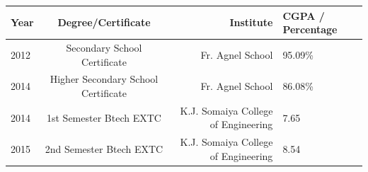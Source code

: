 \documentclass[letterpaper,11pt]{article}
\begin{document}
\begin{table}[h!]
  \begin{center}
      \begin{tabular}{l|c|r|l} %
      \hspace{0.2cm}\textbf{Year}\hspace{0.2cm} &\hspace{0.2cm} \textbf{Degree/Certificate}\hspace{0.2cm} &\hspace{0.2cm} \textbf{Institute}\hspace{2.3cm} &\hspace{0.2cm} \textbf{CGPA / Percentage}\hspace{0.2cm}\\
      \hline
       2012 & \hspace{0.2cm} Secondary School Certificate \hspace{0.2cm} & \hspace{0.2cm}Fr. Agnel School\hspace{1.7cm} & \hspace{1.2cm} 95.09\% \hspace{0.2cm}\\
       2014 & \hspace{0.2cm} Higher Secondary School Certificate \hspace{0.2cm} & \hspace{0.2cm}Fr. Agnel School\hspace{1.7cm} & \hspace{1.2cm} 86.08\% \hspace{0.2cm}\\
      2014 & \hspace{0.2cm} 1st Semester Btech EXTC \hspace{0.2cm} & \hspace{0.2cm}K.J. Somaiya College of Engineering\hspace{0.2cm} & \hspace{1.2cm} 7.65 \hspace{0.2cm}\\
		2015 & \hspace{0.2cm} 2nd Semester Btech EXTC \hspace{0.2cm} & \hspace{0.2cm}K.J. Somaiya College of Engineering\hspace{0.2cm} & \hspace{1.2cm} 8.54 \hspace{0.2cm}\\

\end{tabular}
\end{center}
\end{table}
\end{document}
